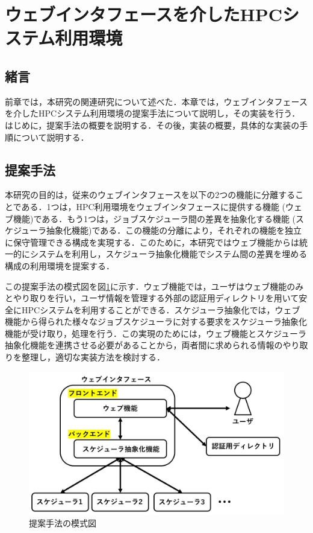 
\section{ウェブインタフェースを介したHPCシステム利用環境}

\subsection{緒言}
前章では，本研究の関連研究について述べた．本章では，ウェブインタフェースを介したHPCシステム利用環境の提案手法について説明し，その実装を行う．はじめに，提案手法の概要を説明する．その後，実装の概要，具体的な実装の手順について説明する．\par

\subsection{提案手法}
本研究の目的は，従来のウェブインタフェースを以下の2つの機能に分離することである．1つは，HPC利用環境をウェブインタフェースに提供する機能 (ウェブ機能)である．もう1つは，ジョブスケジューラ間の差異を抽象化する機能 (スケジューラ抽象化機能)である．この機能の分離により，それぞれの機能を独立に保守管理できる構成を実現する．このために，本研究ではウェブ機能からは統一的にシステムを利用し，スケジューラ抽象化機能でシステム間の差異を埋める構成の利用環境を提案する．\par
この提案手法の模式図を図\ref{fig6}に示す．ウェブ機能では，ユーザはウェブ機能のみとやり取りを行い，ユーザ情報を管理する外部の認証用ディレクトリを用いて安全にHPCシステムを利用することができる．スケジューラ抽象化では，ウェブ機能から得られた様々なジョブスケジューラに対する要求をスケジューラ抽象化機能が受け取り，処理を行う．この実現のためには，ウェブ機能とスケジューラ抽象化機能を連携させる必要があることから，両者間に求められる情報のやり取りを整理し，適切な実装方法を検討する．\par

\begin{figure}[tb]
    \centering
    \includegraphics[width=120mm]{./fig/proposed_method.png}
    \caption{提案手法の模式図}
    \label{fig6}
\end{figure}

